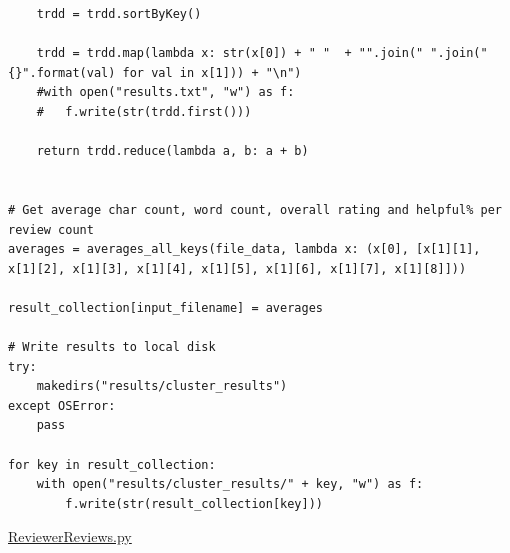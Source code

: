\documentclass{scrartcl}
\theoremstyle{my_th_style}
\begin{document}
\begin{lstlisting}
	trdd = trdd.sortByKey()

	trdd = trdd.map(lambda x: str(x[0]) + " "  + "".join(" ".join("{}".format(val) for val in x[1])) + "\n")
	#with open("results.txt", "w") as f:
	#	f.write(str(trdd.first()))
	
	return trdd.reduce(lambda a, b: a + b)
	

# Get average char count, word count, overall rating and helpful% per review count
averages = averages_all_keys(file_data, lambda x: (x[0], [x[1][1], x[1][2], x[1][3], x[1][4], x[1][5], x[1][6], x[1][7], x[1][8]])) 

result_collection[input_filename] = averages

# Write results to local disk
try:
	makedirs("results/cluster_results")
except OSError:
	pass

for key in result_collection:
	with open("results/cluster_results/" + key, "w") as f:
		f.write(str(result_collection[key]))

\end{lstlisting}
\newpage
\underline{ReviewerReviews.py}
\end{document}
